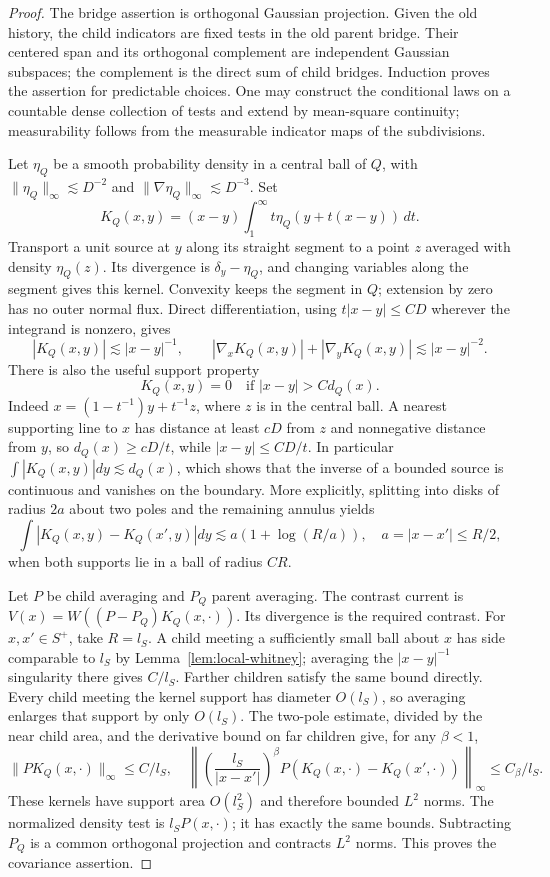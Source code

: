 \documentclass[11pt]{article}
\numberwithin{equation}{section}
\begin{document}
\begin{proof}
The bridge assertion is orthogonal Gaussian projection. Given the old
history, the child indicators are fixed tests in the old parent bridge.
Their centered span and its orthogonal complement are independent
Gaussian subspaces; the complement is the direct sum of child bridges.
Induction proves the assertion for predictable choices. One may construct
the conditional laws on a countable dense collection of tests and extend
by mean-square continuity; measurability follows from the measurable
indicator maps of the subdivisions.

Let $\eta_Q$ be a smooth probability density in a central ball of $Q$,
with $\|\eta_Q\|_\infty\lesssim D^{-2}$ and
$\|\nabla\eta_Q\|_\infty\lesssim D^{-3}$. Set
\[
 K_Q(x,y)=(x-y)\int_1^\infty t\eta_Q(y+t(x-y))\,dt.
\]
Transport a unit source at $y$ along its straight segment to a point
$z$ averaged with density $\eta_Q(z)$. Its divergence is
$\delta_y-\eta_Q$, and changing variables along the segment gives this
kernel. Convexity keeps the segment in $Q$; extension by zero has no
outer normal flux. Direct differentiation, using
$t|x-y|\le CD$ wherever the integrand is nonzero, gives
\[
 |K_Q(x,y)|\lesssim |x-y|^{-1},\qquad
 |\nabla_xK_Q(x,y)|+|\nabla_yK_Q(x,y)|\lesssim |x-y|^{-2}.
\]
There is also the useful support property
\[
 K_Q(x,y)=0\quad\text{if }|x-y|>Cd_Q(x).
\]
Indeed $x=(1-t^{-1})y+t^{-1}z$, where $z$ is in the central ball. A
nearest supporting line to $x$ has distance at least $cD$ from $z$ and
nonnegative distance from $y$, so $d_Q(x)\ge cD/t$, while
$|x-y|\le CD/t$. In particular $\int|K_Q(x,y)|dy\lesssim d_Q(x)$,
which shows that the inverse of a bounded source is continuous and
vanishes on the boundary. More explicitly, splitting into disks of
radius $2a$ about two poles and the remaining annulus yields
\[
 \int|K_Q(x,y)-K_Q(x',y)|dy
 \lesssim a(1+\log(R/a)),\quad a=|x-x'|\le R/2,
\]
when both supports lie in a ball of radius $CR$.

Let $P$ be child averaging and $P_Q$ parent averaging. The contrast
current is
$V(x)=W((P-P_Q)K_Q(x,\cdot))$. Its divergence is the required contrast.
For $x,x'\in S^+$, take $R=l_S$. A child meeting a sufficiently small
ball about $x$ has side comparable to $l_S$ by Lemma~\ref{lem:local-whitney};
averaging the $|x-y|^{-1}$ singularity there gives $C/l_S$. Farther
children satisfy the same bound directly. Every child meeting the kernel
support has diameter $O(l_S)$, so averaging enlarges that support by
only $O(l_S)$. The two-pole estimate, divided by the near child area,
and the derivative bound on far children give, for any $\beta<1$,
\[
 \|PK_Q(x,\cdot)\|_\infty\le C/l_S,
 \quad
 \left\|\left(\frac{l_S}{|x-x'|}\right)^\beta
 P(K_Q(x,\cdot)-K_Q(x',\cdot))\right\|_\infty\le C_\beta/l_S.
\]
These kernels have support area $O(l_S^2)$ and therefore bounded
$L^2$ norms. The normalized density test is
$l_SP(x,\cdot)$; it has exactly the same bounds. Subtracting $P_Q$ is
a common orthogonal projection and contracts $L^2$ norms. This proves
the covariance assertion.


\end{proof}
\end{document}
